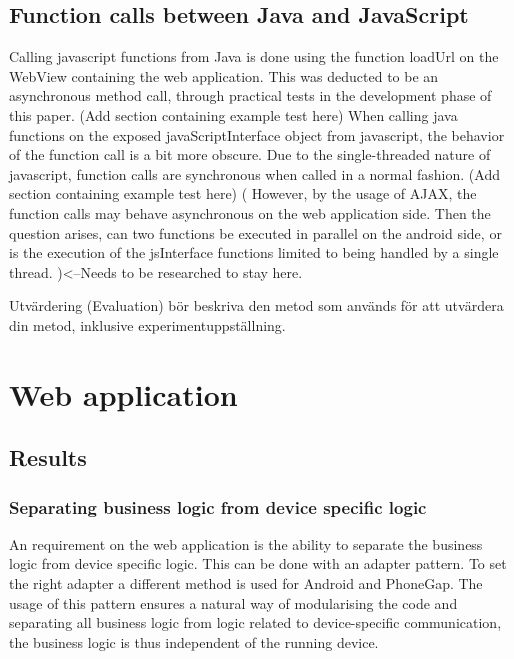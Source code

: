\documentclass{cslthse-msc}
\begin{document}
\subsection {Function calls between Java and JavaScript}
Calling javascript functions from Java is done using the function loadUrl on the WebView containing the web application. This was deducted to be an asynchronous method call, through practical tests in the development phase of this paper. 
\newline\newline
(Add section containing example test here)
\newline\newline
When calling java functions on the exposed javaScriptInterface object from javascript, the behavior of the function call is a bit more obscure. Due to the single-threaded nature of javascript, function calls are synchronous when called in a normal fashion.
\newline\newline
(Add section containing example test here)
\newline\newline
( However, by the usage of AJAX, the function calls may behave asynchronous on the web application side. Then the question arises, can two functions be executed in parallel on the android side, or is the execution of the jsInterface functions limited to being handled by a single thread. )<--Needs to be researched to stay here.

Utvärdering (Evaluation) bör beskriva den metod som används för att utvärdera din metod, inklusive experimentuppställning.
\section{Web application} 
\subsection{Results}
\subsubsection{Separating business logic from device specific logic}
An requirement on the web application is the ability to separate the business logic from device specific logic. This can be done with an adapter pattern. To set the right adapter a different method is used for Android and PhoneGap. The usage of this pattern ensures a natural way of modularising the code and separating all business logic from logic related to device-specific communication, the business logic is thus independent of the running device. 
\end{document}
